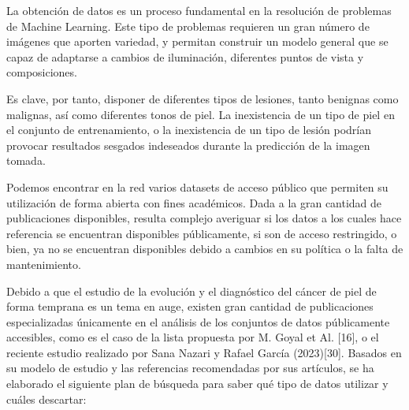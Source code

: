 La obtención de datos es un proceso fundamental en la resolución de problemas de Machine Learning. Este tipo de problemas requieren un gran número de imágenes que aporten variedad, y permitan construir un modelo general que se capaz de adaptarse a cambios de iluminación, diferentes puntos de vista y composiciones.

Es clave, por tanto, disponer de diferentes tipos de lesiones, tanto benignas como malignas, así como diferentes tonos de piel. La inexistencia de un tipo de piel en el conjunto de entrenamiento, o la inexistencia de un tipo de lesión podrían provocar resultados sesgados indeseados durante la predicción de la imagen tomada.

Podemos encontrar en la red varios datasets de acceso público que permiten su utilización de forma abierta con fines académicos. Dada a la gran cantidad de publicaciones disponibles, resulta complejo averiguar si los datos a los cuales hace referencia se encuentran disponibles públicamente, si son de acceso restringido, o bien, ya no se encuentran disponibles debido a cambios en su política o la falta de mantenimiento.

Debido a que el estudio de la evolución y el diagnóstico del cáncer de piel de forma temprana es un tema en auge, existen gran cantidad de publicaciones especializadas únicamente en el análisis de los conjuntos de datos públicamente accesibles, como es el caso de la lista propuesta por M. Goyal et Al. [16], o el reciente estudio realizado por Sana Nazari y Rafael García (2023)[30].
Basados en su modelo de estudio y las referencias recomendadas por sus artículos, se ha elaborado el siguiente plan de búsqueda para saber qué tipo de datos utilizar y cuáles descartar:

